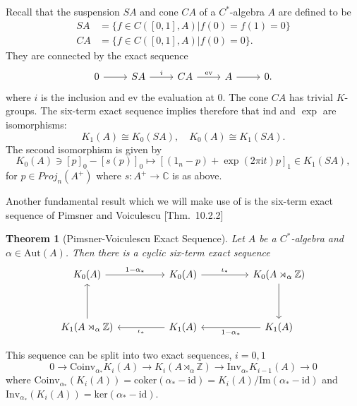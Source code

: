 \documentclass[11pt]{amsart}
\newtheorem{theorem}{Theorem}[section]\newcommand{\bigzero}{\mbox{\normalfont\Large\bfseries 0}}
\newcommand{\Z}{\mathbb{Z}}
\newcommand{\C}{\mathbb{C}}
\begin{document}
Recall that the suspension $SA$ and cone $CA$ of a $C^*$-algebra $A$ are defined to be
    \begin{align*}
        SA &=\{f\in C([0,1], A)|f(0)=f(1)=0 \}\\
        CA &=\{f\in C([0,1], A)|f(0)=0 \}.
    \end{align*}
They are connected by the exact sequence 
$$\begin{tikzcd}
	0 & SA & CA & A & 0.
	\arrow[from=1-1, to=1-2]
	\arrow["i", from=1-2, to=1-3]
	\arrow["\text{ev}", from=1-3, to=1-4]
	\arrow[from=1-4, to=1-5]
\end{tikzcd}$$
where $i$ is the inclusion and $\text{ev}$ the evaluation at $0$. The cone $CA$ has trivial $K$-groups. The six-term exact sequence implies therefore that $\mathrm{ind}$ and $\exp$ are isomorphisms:
$$K_1(A)\cong K_0(SA),\quad K_0(A)\cong K_1(SA).$$
The second isomorphism is given by
\begin{equation}\label{Bottmap}
    K_0(A)\ni [p]_0-[s(p)]_0 \mapsto [(1_n-p)+\exp(2\pi\text{i}t)p]_1\in K_1(SA),
\end{equation}
for $p\in Proj_n(A^+)$ where $s:A^+\to\C$ is as above.

Another fundamental result which we will make use of is the six-term exact sequence of Pimsner and Voiculescu \cite{blackadar1998k}[Thm.~10.2.2] 
\begin{theorem}[Pimsner-Voiculescu Exact Sequence]\label{PVES_thm}
    Let $A$ be a $C^*$-algebra and $\alpha \in \text{Aut}(A)$. Then there is a cyclic six-term exact sequence
    \begin{equation}\label{PVES}
        \begin{tikzcd}
	{K_0(A)} && {K_0(A)} && {K_0(A\rtimes_\alpha\Z)} \\
	\\
	{K_1(A\rtimes_\alpha\Z)} && {K_1(A)} && {K_1(A)}
	\arrow["{1-\alpha_*}", from=1-1, to=1-3]
	\arrow["{\iota_*}", from=1-3, to=1-5]
	\arrow[from=1-5, to=3-5]
	\arrow["{\iota_*}", from=3-3, to=3-1]
	\arrow["{1-\alpha_*}", from=3-5, to=3-3]
    \arrow[from=3-1, to=1-1]
\end{tikzcd}
    \end{equation}
\end{theorem}
This sequence can be split into two exact sequences, $i=0,1$
\begin{equation}\label{eq-PV}
0\to \mathrm{Coinv}_{\alpha_*}K_i(A) \to%
K_i(A\rtimes_\alpha\Z) \to
\mathrm{Inv}_{\alpha_*} K_{i-1}(A) \to  0
\end{equation}
where
$\mathrm{Coinv}_{\alpha_*}(K_i(A)) = \mathrm{coker}(\alpha_*-\mathrm{id})=K_i(A)/\mathrm{Im}(\alpha_*-\mathrm{id})$ and 
$    \mathrm{Inv}_{\alpha_*}(K_i(A)) = \mathrm{ker}(\alpha_*-\mathrm{id})
$.
\end{document}
